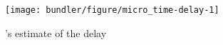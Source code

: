 \begin{figure}[t]
    \centering
\begin{knitrout}
\color{fgcolor}
\texttt{[image: bundler/figure/micro\_time-delay-1]} 

\end{knitrout}

    \caption{\name's estimate of the delay }
    \label{fig:micro:time-delay}
\end{figure}
